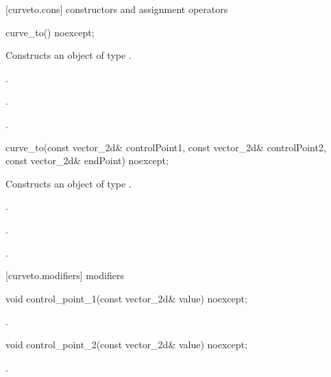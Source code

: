  [curveto.cons] { constructors and assignment operators}

\begin{itemdecl}
    curve_to() noexcept;
\end{itemdecl}
\begin{itemdescr}
	\pnum
	\effects
	Constructs an object of type .
	
	\pnum
	\postconditions
	.

	.

	.

\end{itemdescr}

\begin{itemdecl}
    curve_to(const vector_2d& controlPoint1, const vector_2d& controlPoint2,
      const vector_2d& endPoint) noexcept;
\end{itemdecl}
\begin{itemdescr}
	\pnum
	\effects
	Constructs an object of type .
	
	\pnum
	\postconditions
	.

	.

	.

\end{itemdescr}

 [curveto.modifiers]{ modifiers}

\begin{itemdecl}
    void control_point_1(const vector_2d& value) noexcept;
\end{itemdecl}
\begin{itemdescr}
	\pnum
	\postconditions
	.
	
\end{itemdescr}

\begin{itemdecl}
    void control_point_2(const vector_2d& value) noexcept;
\end{itemdecl}
\begin{itemdescr}
	\pnum
	\postconditions
	.
	
\end{itemdescr}

